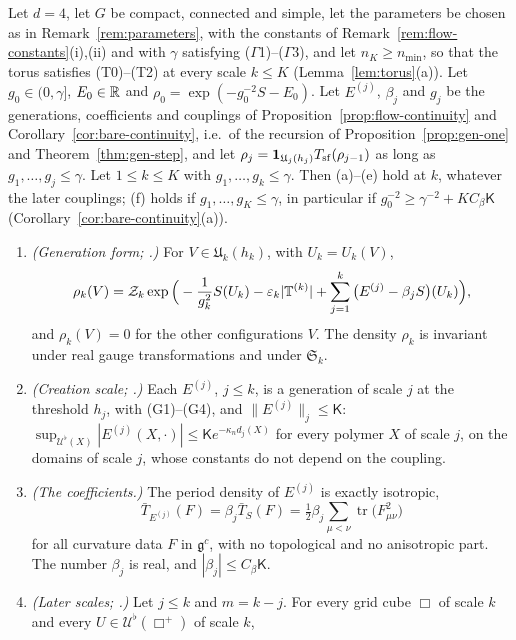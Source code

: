 \begin{theorem}\label{thm:sf-flow}
Let $d=4$, let $G$ be compact, connected and simple, let the parameters be chosen as in Remark~\ref{rem:parameters}, with the constants of Remark~\ref{rem:flow-constants}(i),(ii) and with $\gamma$ satisfying ($\Gamma$1)--($\Gamma$3), and let $n_K\ge n_{\min}$, so that the torus satisfies (T0)--(T2) at every scale $k\le K$ (Lemma~\ref{lem:torus}(a)). Let $g_0\in(0,\gamma]$, $E_0\in\mathbb R$ and $\rho_0=\exp(-g_0^{-2}S-E_0)$. Let $E^{(j)}$, $\beta_j$ and $g_j$ be the generations, coefficients and couplings of Proposition~\ref{prop:flow-continuity} and Corollary~\ref{cor:bare-continuity}, i.e.\ of the recursion of Proposition~\ref{prop:gen-one} and Theorem~\ref{thm:gen-step}, and let $\rho_j=\mathbf 1_{\mathfrak U_j(h_j)}T_{\rm sf}(\rho_{j-1})$ as long as $g_1,\dots,g_j\le\gamma$. Let $1\le k\le K$ with $g_1,\dots,g_k\le\gamma$. Then (a)--(e) hold at $k$, whatever the later couplings; (f) holds if $g_1,\dots,g_K\le\gamma$, in particular if $g_0^{-2}\ge\gamma^{-2}+KC_\beta\mathsf K$ (Corollary~\ref{cor:bare-continuity}(a)).
\begin{enumerate}[label=(\alph*)]
\item \emph{(Generation form; \cite[(0.22)--(0.24)]{BalYM4I}.)} For $V\in\mathfrak U_k(h_k)$, with $U_k=U_k(V)$,
\[
\rho_k(V)=\mathcal Z_k\exp\Big(-\frac1{g_k^2}S(U_k)-\varepsilon_k|\mathbb T^{(k)}|+\sum_{j=1}^k\big(E^{(j)}-\beta_jS\big)(U_k)\Big),
\]
and $\rho_k(V)=0$ for the other configurations $V$. The density $\rho_k$ is invariant under real gauge transformations and under $\mathfrak S_k$.
\item \emph{(Creation scale; \cite[(0.25)]{BalYM4I}.)} Each $E^{(j)}$, $j\le k$, is a generation of scale $j$ at the threshold $h_j$, with (G1)--(G4), and $\|E^{(j)}\|_j\le\mathsf K$: $\sup_{\mathcal U^\flat(X)}|E^{(j)}(X,\cdot)|\le\mathsf Ke^{-\kappa_nd_j(X)}$ for every polymer $X$ of scale $j$, on the domains of scale $j$, whose constants do not depend on the coupling.
\item \emph{(The coefficients.)} The period density of $E^{(j)}$ is exactly isotropic,
\[
\bar T_{E^{(j)}}(F)=\beta_j\bar T_S(F)=\tfrac12\beta_j\sum_{\mu<\nu}\operatorname{tr}\big(F_{\mu\nu}^2\big)
\]
for all curvature data $F$ in $\mathfrak g^c$, with no topological and no anisotropic part. The number $\beta_j$ is real, and $|\beta_j|\le C_\beta\mathsf K$.
\item \emph{(Later scales; \cite[(0.28)--(0.30)]{BalYM4I}.)} Let $j\le k$ and $m=k-j$. For every grid cube $\Box$ of scale $k$ and every $U\in\mathcal U^\flat(\Box^+)$ of scale $k$,

\end{enumerate}
\end{theorem}
